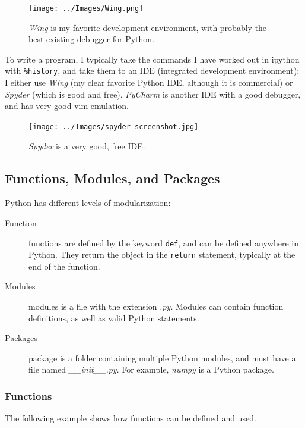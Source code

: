 \begin{figure}
  \centering
  \texttt{[image: ../Images/Wing.png]}\\
  \caption{\emph{Wing} is my favorite development environment, with probably the best existing debugger for Python.}
\end{figure}

To write a program, I typically take the commands I have worked out in ipython with \lstinline{%history}, and take them to an IDE (integrated development environment): I either use \emph{Wing} (my clear favorite Python IDE, although it is commercial) or \emph{Spyder} (which is good and free). \emph{PyCharm} is another IDE with a good debugger, and has very good vim-emulation.

\begin{figure}
  \centering
  \texttt{[image: ../Images/spyder-screenshot.jpg]}\\
  \caption{\emph{Spyder} is a very good, free IDE.}
\end{figure}

\subsection{Functions, Modules, and Packages}

Python has different levels of modularization:

\begin{description}
  \item[Function] \Glspl{function} are defined by the keyword \lstinline{def}, and can be defined anywhere in Python. They return the object in the \lstinline{return} statement, typically at the end of the function.
  \item[Modules] \Glspl{module} is a file with the extension \emph{.py}. Modules can contain function definitions, as well as valid Python statements.
  \item[Packages] \Gls{package} is a folder containing multiple Python modules, and must have a file named \emph{\_\_init\_\_.py}. For example, \emph{numpy} is a Python package.
\end{description}

\subsubsection{Functions}
The following example shows how functions can be defined and used.



